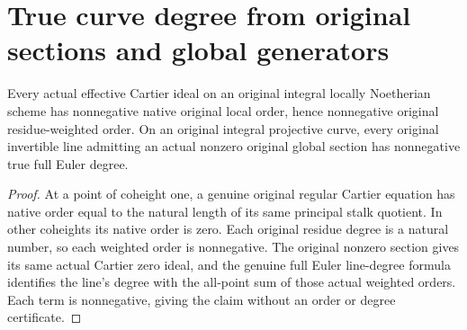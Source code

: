 \section{True curve degree from original sections and global generators}

\begin{theorem}
\label{thm:fc-original-nonzero-section-degree-nonnegative}
\leanok
{}
Every actual effective Cartier ideal on an original integral locally
Noetherian scheme has nonnegative native original local order, hence
nonnegative original residue-weighted order.  On an original integral
projective curve, every original invertible line admitting an actual
nonzero original global section has nonnegative true full Euler degree.
\end{theorem}
\begin{proof}
At a point of coheight one, a genuine original regular Cartier equation
has native order equal to the natural length of its same principal stalk
quotient.  In other coheights its native order is zero.  Each original
residue degree is a natural number, so each weighted order is nonnegative.
The original nonzero section gives its same actual Cartier zero ideal,
and the genuine full Euler line-degree formula identifies the line's
degree with the all-point sum of those actual weighted orders.  Each term
is nonnegative, giving the claim without an order or degree certificate.
\end{proof}

